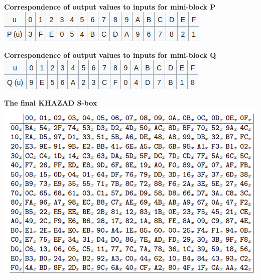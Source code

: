 \documentclass[preprint]{transcrypto}
\begin{document}
\begin{center}
    \textbf{Correspondence of output values to inputs for mini-block P \cite{3}} \linebreak
    \includegraphics[scale=0.5]{Screenshots/ps1.png}
\end{center}
\begin{center}
    \textbf{Correspondence of output values to inputs for mini-block Q \cite{3}} \linebreak
    \includegraphics[scale=0.5]{Screenshots/qs1.png}
\end{center}
\newpage
\begin{center}
        \textbf{The final KHAZAD S-box \cite{2}}
        \includegraphics[scale=0.5]{Screenshots/sbox.png}
\end{center}
\end{document}

